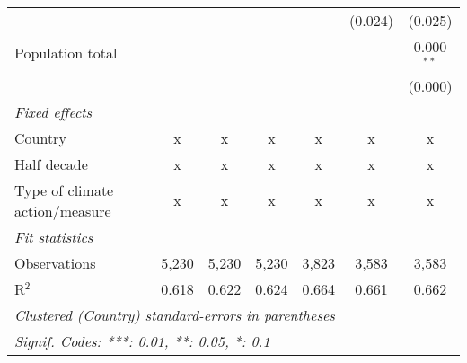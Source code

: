 \begin{tabular}{lcccccc}
                                                                                    &              &               &                &                & (0.024)        & (0.025)\\   
   Population total                                                                 &              &               &                &                &                & 0.000$^{**}$\\   
                                                                                    &              &               &                &                &                & (0.000)\\   
   \emph{Fixed effects}\\
   Country                                                                          & x            & x             & x              & x              & x              & x\\  
   Half decade                                                                      & x            & x             & x              & x              & x              & x\\  
   Type of climate action/measure                                                   & x            & x             & x              & x              & x              & x\\  
   \midrule \emph{Fit statistics}\\
   Observations                                                                     & 5,230        & 5,230         & 5,230          & 3,823          & 3,583          & 3,583\\  
   R$^2$                                                                            & 0.618        & 0.622         & 0.624          & 0.664          & 0.661          & 0.662\\  
   \midrule
   \multicolumn{7}{l}{\emph{Clustered (Country) standard-errors in parentheses}}\\
   \multicolumn{7}{l}{\emph{Signif. Codes: ***: 0.01, **: 0.05, *: 0.1}}\\
\end{tabular}
\par\endgroup


